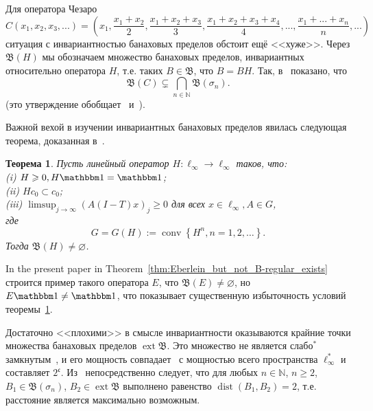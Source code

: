\documentclass[a4paper,14pt]{article} %
\DeclareMathOperator{\ext}{ext}
\DeclareMathOperator{\dist}{dist}
\newcommand{\N}{\ensuremath{\mathbb{N}}}
\newcommand{\B}{\ensuremath{\mathfrak{B}}}
\newcommand{\one}{\ensuremath{\mathbbm 1}}
\theoremstyle{plain}
\newtheorem{theorem}[lemma]{Теорема}
\begin{document}
Для оператора Чезаро
\begin{equation}
	C (x_1, x_2, x_3, ...) = \left(
	x_1,
	\dfrac{x_1+x_2}2,
	\dfrac{x_1+x_2 + x_3}3,
	\dfrac{x_1+x_2+x_3+x_4}4,
	...,
	\dfrac{x_1+...+x_n}n,
	...\right)
\end{equation}
ситуация с инвариантностью банаховых пределов обстоит ещё <<хуже>>.
Через $\B(H)$ мы обозначаем множество банаховых пределов,
инвариантных относительно оператора $H$,
т.е. таких $B\in \B$, что $B=BH$.
Так, в~\cite[\S2, Theorem 4]{semenov2020dilation} показано, что
\begin{equation}
	\label{eq:B_C_subsetneq_B_sigma_n}
	\B(C) \subsetneq \bigcap_{n\in \N}\B(\sigma_n)
	.
\end{equation}
(это утверждение обобщает~\cite[Theorem 3]{semenov2020invariant_noncommutative}
и~\cite[Theorem 4.8]{ASSU4}).

Важной вехой в изучении инвариантных банаховых пределов явилась следующая теорема,
доказанная в~\cite[\S2]{Semenov2010invariant}.

\begin{theorem}
	\label{thm:Semenov_Sukochev_conditions}
	Пусть линейный оператор $H:\ell_\infty\to\ell_\infty$ таков, что:
	\\(i)   $H \geqslant 0, H \one=\one$;
	\\(ii)  $H c_0 \subset c_0$;
	\\(iii) $\limsup _{j \rightarrow \infty}(A(I-T) x)_j \geqslant 0$ для всех $x \in \ell_{\infty}, A \in G$,
	\\где
	\begin{equation}
		G=G(H):=\operatorname{conv}\left\{H^n, n=1,2, \ldots\right\}
		.
	\end{equation}
	Тогда $\B(H) \ne\varnothing$.
\end{theorem}

In the present paper in Theorem~\ref{thm:Eberlein_but_not_B-regular_exists}
строится пример такого оператора $E$, что $\B(E)\ne\varnothing$,
но $E\one \ne \one$, что показывает существенную избыточность условий теоремы~\ref{thm:Semenov_Sukochev_conditions}.


Достаточно <<плохими>> в смысле инвариантности оказываются крайние точки множества банаховых пределов $\ext \B$.
Это множество не является слабо$^*$ замкнутым~\cite{Nillsen,Talagrand},
и его мощность совпадает~\cite{Chou} с мощностью всего пространства $\ell_\infty^*$
и составляет $2^{\mathfrak c}$.
Из~\cite[Corollary 6]{semenov2020dilation} непосредственно следует, что для любых
$n\in\N$, $n\geq 2$, $B_1 \in \B(\sigma_n)$, $B_2 \in \ext\B$ выполнено равенство
$\dist(B_1,B_2) = 2$, т.е. расстояние является максимально возможным.
\end{document}
